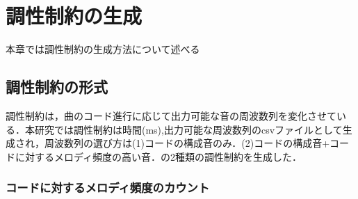 \chapter{調性制約の生成}
本章では調性制約の生成方法について述べる
\section{調性制約の形式}
調性制約は，曲のコード進行に応じて出力可能な音の周波数列を変化させている．本研究では調性制約は時間(ms),出力可能な周波数列のcsvファイルとして生成され，周波数列の選び方は(1)コードの構成音のみ．(2)コードの構成音+コードに対するメロディ頻度の高い音．の2種類の調性制約を生成した．
\subsection{コードに対するメロディ頻度のカウント}
